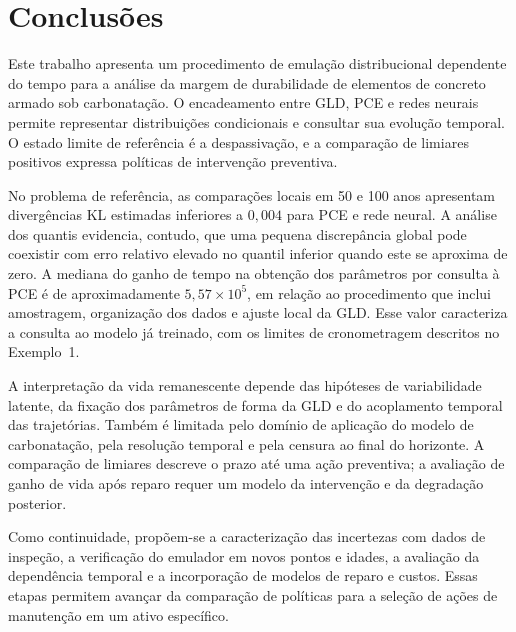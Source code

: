 \section{Conclusões}\label{sec:conclusoes}

Este trabalho apresenta um procedimento de emulação distribucional dependente do tempo para a análise da margem de durabilidade de elementos de concreto armado sob carbonatação. O encadeamento entre GLD, PCE e redes neurais permite representar distribuições condicionais e consultar sua evolução temporal. O estado limite de referência é a despassivação, e a comparação de limiares positivos expressa políticas de intervenção preventiva.

No problema de referência, as comparações locais em 50 e 100 anos apresentam divergências KL estimadas inferiores a $0{,}004$ para PCE e rede neural. A análise dos quantis evidencia, contudo, que uma pequena discrepância global pode coexistir com erro relativo elevado no quantil inferior quando este se aproxima de zero. A mediana do ganho de tempo na obtenção dos parâmetros por consulta à PCE é de aproximadamente $5{,}57\times10^5$, em relação ao procedimento que inclui amostragem, organização dos dados e ajuste local da GLD. Esse valor caracteriza a consulta ao modelo já treinado, com os limites de cronometragem descritos no Exemplo~1.


A interpretação da vida remanescente depende das hipóteses de variabilidade latente, da fixação dos parâmetros de forma da GLD e do acoplamento temporal das trajetórias. Também é limitada pelo domínio de aplicação do modelo de carbonatação, pela resolução temporal e pela censura ao final do horizonte. A comparação de limiares descreve o prazo até uma ação preventiva; a avaliação de ganho de vida após reparo requer um modelo da intervenção e da degradação posterior.

Como continuidade, propõem-se a caracterização das incertezas com dados de inspeção, a verificação do emulador em novos pontos e idades, a avaliação da dependência temporal e a incorporação de modelos de reparo e custos. Essas etapas permitem avançar da comparação de políticas para a seleção de ações de manutenção em um ativo específico.
